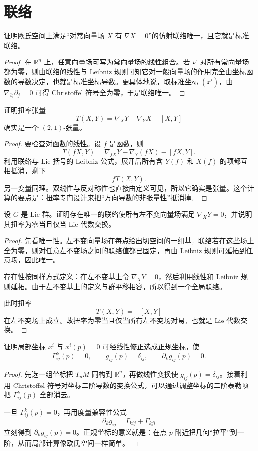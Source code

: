 \documentclass[11pt,a4paper,openany]{ctexbook}
\numberwithin{equation}{chapter}
\begin{document}
\section{联络}

\begin{problem}
证明欧氏空间上满足“对常向量场 \(X\) 有 \(\nabla X=0\)”的仿射联络唯一，且它就是标准联络。
\end{problem}
\begin{proof}
在 \(\mathbb R^n\) 上，任意向量场可写为常向量场的线性组合。若 \(\nabla\) 对所有常向量场都为零，则由联络的线性与 Leibniz 规则可知它对一般向量场的作用完全由坐标函数的导数决定，也就是标准坐标导数。更具体地说，取标准坐标 \((x^i)\)，由 \(\nabla_{\partial_i}\partial_j=0\) 可得 Christoffel 符号全为零，于是联络唯一。
\end{proof}

\begin{problem}
证明扭率张量
\[
T(X,Y)=\nabla_XY-\nabla_YX-[X,Y]
\]
确实是一个 \((2,1)\)-张量。
\end{problem}
\begin{proof}
要检查对函数的线性。设 \(f\) 是函数，则
\[
T(fX,Y)=\nabla_{fX}Y-\nabla_Y(fX)-[fX,Y].
\]
利用联络与 Lie 括号的 Leibniz 公式，展开后所有含 \(Y(f)\) 和 \(X(f)\) 的项都互相抵消，剩下
\[
fT(X,Y).
\]
另一变量同理。双线性与反对称性也直接由定义可见，所以它确实是张量。这个计算的要点是：扭率专门设计来把“方向导数的非张量性”抵消掉。
\end{proof}

\begin{problem}
设 \(G\) 是 Lie 群。证明存在唯一的联络使所有左不变向量场满足 \(\nabla_XY=0\)，并说明其扭率为零当且仅当 Lie 代数交换。
\end{problem}
\begin{proof}
先看唯一性。左不变向量场在每点给出切空间的一组基，联络若在这些场上全为零，则对任意左不变场之间的联络值都已固定，再由 Leibniz 规则可延拓到任意场，因此唯一。

存在性按同样方式定义：在左不变基上令 \(\nabla_XY=0\)，然后利用线性和 Leibniz 规则延拓。由于左不变基上的定义与群平移相容，所以得到一个全局联络。

此时扭率
\[
T(X,Y)=-[X,Y]
\]
在左不变场上成立。故扭率为零当且仅当所有左不变场对易，也就是 Lie 代数交换。
\end{proof}

\begin{problem}
证明局部坐标 \(x^i\) 与 \(x^i(p)=0\) 可经线性修正选成正规坐标，使
\[
\Gamma^k_{ij}(p)=0,\qquad g_{ij}(p)=\delta_{ij},\qquad \partial_k g_{ij}(p)=0.
\]
\end{problem}
\begin{proof}
先选一组坐标把 \(T_pM\) 同构到 \(\mathbb R^n\)，再做线性变换使 \(g_{ij}(p)=\delta_{ij}\)。接着利用 Christoffel 符号对坐标二阶导数的变换公式，可以通过调整坐标的二阶泰勒项把 \(\Gamma^k_{ij}(p)\) 全部消去。

一旦 \(\Gamma^k_{ij}(p)=0\)，再用度量兼容性公式
\[
\partial_k g_{ij}=\Gamma_{kij}+\Gamma_{kji}
\]
立刻得到 \(\partial_k g_{ij}(p)=0\)。正规坐标的意义就是：在点 \(p\) 附近把几何“拉平”到一阶，从而局部计算像欧氏空间一样简单。
\end{proof}
\end{document}
